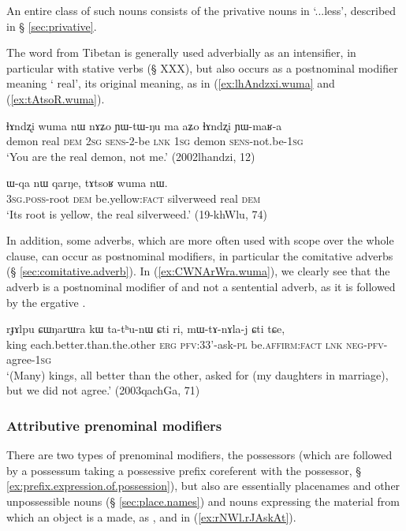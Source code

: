 An entire class of such nouns consists of the privative nouns in  `...less', described in § \ref{sec:privative}.

The word  from Tibetan  is generally used adverbially as an intensifier, in particular with stative verbs (§ XXX), but also occurs as a postnominal modifier meaning ` real', its original meaning, as in (\ref{ex:lhAndzxi.wuma} and (\ref{ex:tAtsoR.wuma}).

\begin{exe}
\ex \label{ex:lhAndzxi.wuma}
\gll ɬɤndʐi wuma nɯ nɤʑo ɲɯ-tɯ-ŋu ma aʑo ɬɤndʐi ɲɯ-maʁ-a \\
demon real \textsc{dem} \textsc{2sg} \textsc{sens}-2-be \textsc{lnk} \textsc{1sg} demon \textsc{sens}-not.be-\textsc{1sg} \\
\glt `You are the real demon, not me.' (2002lhandzi, 12)
\end{exe}

\begin{exe}
\ex \label{ex:tAtsoR.wuma}
\gll ɯ-qa nɯ qarŋe, tɤtsoʁ wuma nɯ. \\
\textsc{3sg}.\textsc{poss}-root \textsc{dem} be.yellow:\textsc{fact} silverweed real \textsc{dem} \\
\glt `Its root is yellow, the real silverweed.' (19-khWlu, 74)
\end{exe}

In addition, some adverbs, which are more often used with scope over the whole clause, can occur as postnominal modifiers, in particular the comitative adverbs (§ \ref{sec:comitative.adverb}). In (\ref{ex:CWNArWra.wuma}), we clearly see that the adverb  is a postnominal modifier of  and not a sentential adverb, as it is followed by the ergative .

\begin{exe}
\ex \label{ex:CWNArWra.kW}
\gll   rɟɤlpu ɕɯŋarɯra kɯ ta-tʰu-nɯ ɕti ri, mɯ-tɤ-nɤla-j ɕti tɕe, \\
king each.better.than.the.other \textsc{erg} \textsc{pfv}:3\fl{}3'-ask-\textsc{pl} be.\textsc{affirm}:\textsc{fact} \textsc{lnk} \textsc{neg}-\textsc{pfv}-agree-\textsc{1sg} \\
\glt `(Many) kings, all better than the other, asked for (my daughters in marriage), but we did not agree.' (2003qachGa, 71)
\end{exe}

\subsubsection{Attributive prenominal modifiers}
There are two types of prenominal modifiers, the possessors (which are followed by a possessum taking a possessive prefix coreferent with the possessor, § \ref{ex:prefix.expression.of.possession}), but also   are essentially placenames and other unpossessible nouns (§ \ref{sec:place.names}) and nouns expressing the material from which an object is a made, as ,  and  
in (\ref{ex:rNWl.rJAskAt}).

